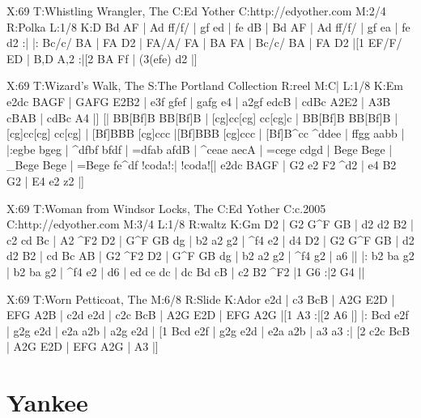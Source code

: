 \documentclass{article}
\begin{document}
\begin{abc}[name]
X:69
T:Whistling Wrangler, The
C:Ed Yother
C:http://edyother.com
M:2/4
R:Polka
L:1/8
K:D
Bd AF | Ad ff/f/ | gf ed | fe dB |
Bd AF | Ad ff/f/ | gf ea | fe d2 :|
|: Bc/c/ BA | FA D2 | FA/A/ FA | BA FA |
Bc/c/ BA | FA D2 |[1 EF/F/ ED | B,D A,2 :|[2 BA Ff | (3(efe) d2 |]
\end{abc}

\begin{abc}[name]
X:69
T:Wizard's Walk, The
S:The Portland Collection
R:reel
M:C|
L:1/8
K:Em
e2dc BAGF | GAFG E2B2 | e3f gfef | gafg e4 |
a2gf edcB | cdBc A2E2 | A3B cBAB | cdBc A4 |]
[| BB[Bf]B BB[Bf]B | [cg]cc[cg] cc[cg]c | BB[Bf]B BB[Bf]B | [cg]cc[cg] cc[cg] |
[Bf]BBB [cg]ccc |[Bf]BBB [cg]ccc | [Bf]B^cc ^ddee | ffgg aabb |
|:egbe bgeg | ^dfbf bfdf | =dfab afdB | ^ceae aecA |
=cege cdgd | Bege Bege | _Bege Bege | =Bege fe^df !coda!:|
!coda![| e2dc BAGF | G2 e2 F2 ^d2 | e4 B2 G2 | E4 e2 z2 |]
\end{abc}

\begin{abc}[name]
X:69
T:Woman from Windsor Locks, The
C:Ed Yother
C:c.2005
C:http://edyother.com
M:3/4
L:1/8
R:waltz
K:Gm
D2 | G2 G^F GB | d2 d2 B2 | c2 cd Bc | A2 ^F2 D2 |
G^F GB dg | b2 a2 g2 | ^f4 e2 | d4 D2 |
 G2 G^F GB | d2 d2 B2 | cd Bc AB | G2 ^F2 D2 |
G^F GB dg | b2 a2 g2 |  ^f4 g2 | a6 ||
|: b2 ba g2 | b2 ba g2 | ^f4 e2 | d6 |
ed ce dc | dc Bd cB | c2 B2 ^F2 |1 G6 :|2 G4 ||
\end{abc}

\begin{abc}[name]
X:69
T:Worn Petticoat, The
M:6/8
R:Slide
K:Ador
e2d | c3 BcB | A2G E2D | EFG A2B | c2d e2d |
c2c BcB | A2G E2D | EFG A2G |[1 A3 :|[2 A6 |]
|: Bcd e2f | g2g e2d | e2a a2b | a2g e2d |
[1 Bcd e2f | g2g e2d | e2a a2b | a3 a3 :|
[2 c2c BcB | A2G E2D | EFG A2G | A3 |]
\end{abc}

\section{Yankee}
\end{document}
